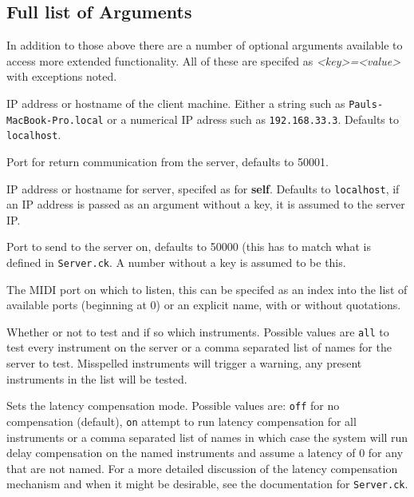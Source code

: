 \documentclass[../main.tex]{subfiles}
\begin{document}
\subsection{Full list of Arguments}
In addition to those above there are a number of optional arguments available to access more extended functionality. All of these are specifed as \emph{<key>=<value>} with exceptions
noted.
\begin{description} [style=multiline, labelwidth=\widthof{\bfseries server}]
	\item[self] IP address or hostname of the client machine. Either a string such as \texttt{Pauls-MacBook-Pro.local} or a numerical IP adress such as \texttt{192.168.33.3}. 
			Defaults to \texttt{localhost}.
	\item[in] Port for return communication from the server, defaults to 50001.
	\item[server] IP address or hostname for server, specifed as for \textbf{self}. Defaults to \texttt{localhost}, if an IP address is passed as an argument without a key, it is assumed to 
			    the server IP.
	\item[out] Port to send to the server on, defaults to 50000 (this has to match what is defined in \texttt{Server.ck}. A number without a key is assumed to be this.
	\item[midi] The MIDI port on which to listen, this can be specifed as an index into the list of available ports (beginning at 0) or an explicit name, with or without quotations.
	\item[test] Whether or not to test and if so which instruments. Possible values are \texttt{all} to test every instrument on the server or a comma separated list of names
			for the server to test. Misspelled instruments will trigger a warning, any present instruments in the list will be tested.
	\item[delay] Sets the latency compensation mode. Possible values are: \texttt{off} for no compensation (default), \texttt{on} attempt to run latency compensation for all instruments
			   or a comma separated list of names in which case the system will run delay compensation on the named instruments and assume a latency of 0 for any that are
			   not named. For a more detailed discussion of the latency compensation mechanism and when it might be desirable, see the documentation for \texttt{Server.ck}.
\end{description}
\end{document}
